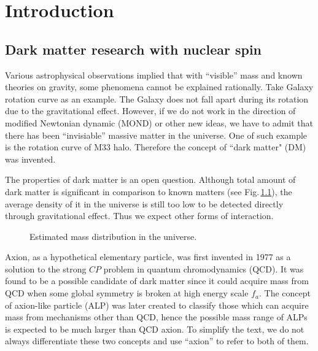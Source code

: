 \chapter{Introduction}\label{ch:intro}

\section{Dark matter research with nuclear spin}

Various astrophysical observations implied that with ``visible'' mass and known theories on gravity, some phenomena cannot be explained rationally. Take Galaxy rotation curve as an example. The Galaxy does not fall apart during its rotation due to the gravitational effect. However, if we do not work in the direction of modified Newtonian dynamic (MOND) or other new ideas, we have to admit that there has been ``invisiable'' massive matter in the universe. One of such example is the rotation curve of M33 halo\cite{Corbelli_M33}. Therefore the concept of ``dark matter" (DM) was invented. 

The properties of dark matter is an open question. Although total amount of dark matter is significant in comparison to known matters (see Fig.\,\ref{fig:matter_mass_ratio}), the average density of it in the universe is still too low to be detected directly through gravitational effect. Thus we expect other forms of interaction. 
\begin{figure}[htbp]
    \centering
    \caption{Estimated mass distribution in the universe\cite{Ackermandmater}. }
    \label{fig:matter_mass_ratio}
\end{figure}

Axion, as a hypothetical elementary particle, was first invented in 1977 as a solution to the strong $CP$ problem in quantum chromodynamics (QCD). %
It was found to be a possible candidate of dark matter since it could acquire mass from QCD when some global symmetry is broken at high energy scale $f_a$. The concept of axion-like particle (ALP) was later created to classify those which can acquire mass from mechanisms other than QCD, hence the possible mass range of ALPs is expected to be much larger than QCD axion. To simplify the text, we do not always differentiate these two concepts and use ``axion'' to refer to both of them. 

